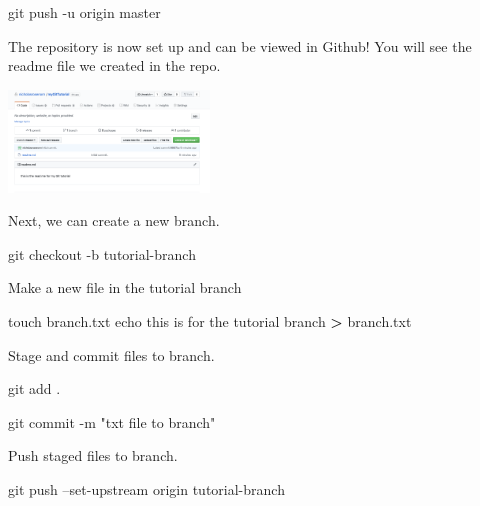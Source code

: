 \documentclass[]{book}
\newenvironment{Shaded}{\begin{snugshade}}{\end{snugshade}}
\newcommand{\StringTok}[1]{\textcolor[rgb]{0.31,0.60,0.02}{#1}}
\newcommand{\FunctionTok}[1]{\textcolor[rgb]{0.00,0.00,0.00}{#1}}
\newcommand{\OperatorTok}[1]{\textcolor[rgb]{0.81,0.36,0.00}{\textbf{#1}}}
\newcommand{\BuiltInTok}[1]{#1}
\newcommand{\NormalTok}[1]{#1}
\begin{document}
\begin{Shaded}
\begin{Highlighting}[]
\FunctionTok{git}\NormalTok{ push -u origin master}
\end{Highlighting}
\end{Shaded}

The repository is now set up and can be viewed in Github! You will see
the readme file we created in the repo.

\includegraphics[width=0.40000\textwidth]{images/github view.png}

Next, we can create a new branch.

\begin{Shaded}
\begin{Highlighting}[]
\FunctionTok{git}\NormalTok{ checkout -b tutorial-branch}
\end{Highlighting}
\end{Shaded}

Make a new file in the tutorial branch

\begin{Shaded}
\begin{Highlighting}[]
\FunctionTok{touch}\NormalTok{ branch.txt}
\BuiltInTok{echo}\NormalTok{ this is for the tutorial branch }\OperatorTok{>}\NormalTok{ branch.txt}
\end{Highlighting}
\end{Shaded}

Stage and commit files to branch.

\begin{Shaded}
\begin{Highlighting}[]
\FunctionTok{git}\NormalTok{ add .}

\FunctionTok{git}\NormalTok{ commit -m }\StringTok{"txt file to branch"}
\end{Highlighting}
\end{Shaded}

Push staged files to branch.

\begin{Shaded}
\begin{Highlighting}[]
\FunctionTok{git}\NormalTok{ push --set-upstream origin tutorial-branch}
\end{Highlighting}
\end{Shaded}
\end{document}

